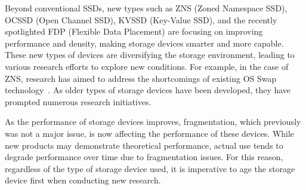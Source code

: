 Beyond conventional SSDs, new types such as ZNS (Zoned Namespace SSD), OCSSD (Open Channel SSD), KVSSD (Key-Value SSD), and the recently spotlighted FDP (Flexible Data Placement) are focusing on improving performance and density, making storage devices smarter and more capable.
These new types of devices are diversifying the storage environment, leading to various research efforts to explore new conditions.
For example, in the case of ZNS, research has aimed to address the shortcomings of existing OS Swap technology~\cite{znswap}.
As older types of storage devices have been developed, they have prompted numerous research initiatives.

As the performance of storage devices improves, fragmentation, which previously was not a major issue, is now affecting the performance of these devices.
While new products may demonstrate theoretical performance, actual use tends to degrade performance over time due to fragmentation issues.
For this reason, regardless of the type of storage device used, it is imperative to age the storage device first when conducting new research.


